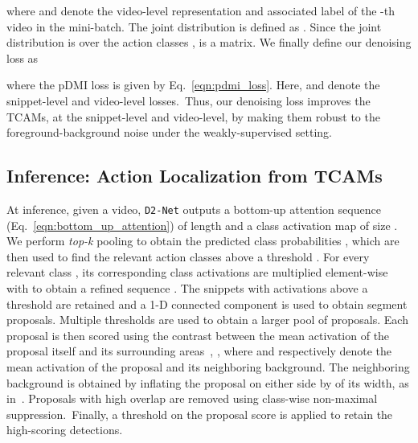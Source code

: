 \documentclass[final]{cvpr}
\def\proposed{\texttt{D2-Net}{}}
\begin{document}
where  and  denote the video-level representation and associated label of the -th video in the mini-batch. The joint distribution is defined as .  Since the joint distribution is over the action classes ,  is a  matrix. We finally define our denoising loss as

where the pDMI loss is given by Eq.~\ref{eqn:pdmi_loss}. Here,  and  denote the snippet-level and video-level losses.~Thus, our denoising loss improves the TCAMs, at the snippet-level and video-level, by making them robust to the foreground-background noise under the weakly-supervised setting. 


\subsection{Inference: Action Localization from TCAMs}
At inference, given a video, \proposed{} outputs a bottom-up attention sequence  (Eq.~\ref{eqn:bottom_up_attention}) of length  and a class activation map  of size . We perform \textit{top-k} pooling to obtain the predicted class probabilities , which are then used to find the relevant action classes above a threshold . For every relevant class , its corresponding class activations  are multiplied element-wise with  to obtain a refined sequence . The snippets with activations above a threshold are retained and a 1-D connected component is used to obtain segment proposals. 
Multiple thresholds are used to obtain a larger pool of proposals. Each proposal is then scored using the contrast between the mean activation of the proposal itself and its surrounding areas~\cite{autoloc}, , where  and  respectively denote the mean activation of the proposal and its neighboring background. The neighboring background is obtained by inflating the proposal on either side by  of its width, as in~\cite{autoloc}.
Proposals with high overlap are removed using class-wise non-maximal suppression.~Finally, a threshold  on the proposal score is applied to retain the high-scoring detections.
\end{document}
